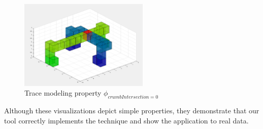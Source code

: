 \begin{figure}
  \centering
  \includegraphics[width=0.55\textwidth]{./figures/crumbIntersection.png}
    \caption{Trace modeling property $\phi_{crumbIntersection=0}$}
    \label{fig:crumbIntersection}
\end{figure}

Although these visualizations depict simple properties, they demonstrate that our tool correctly implements the technique and show the application to real data.

